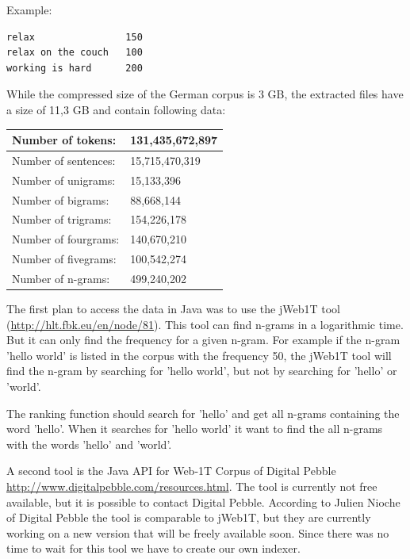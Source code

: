 \documentclass[11pt, accentcolor=tud9b, nochapname]{tudreport}
\begin{document}
Example:

\begin{lstlisting}
relax                150
relax on the couch   100
working is hard      200
\end{lstlisting}

While the compressed size of the German corpus is 3 GB, the extracted
files have a size of 11,3 GB and contain following data:

\vspace{10pt}
\begin{tabular}{| l | l |}
  \hline
  Number of tokens: & 131,435,672,897 \\ \hline
  Number of sentences: & 15,715,470,319 \\ \hline
  Number of unigrams: & 15,133,396 \\ \hline
  Number of bigrams: & 88,668,144 \\ \hline
  Number of trigrams: & 154,226,178 \\ \hline
  Number of fourgrams: & 140,670,210 \\ \hline
  Number of fivegrams: & 100,542,274 \\ \hline
  Number of n-grams: & 499,240,202 \\ \hline
\end{tabular}
\vspace{10pt}

The first plan to access the data in Java was to use the jWeb1T tool
(\url{http://hlt.fbk.eu/en/node/81}). This tool can find n-grams in a
logarithmic time. But it can only find the frequency for a given
n-gram. For example if the n-gram 'hello world' is listed in the
corpus with the frequency 50, the jWeb1T tool will find the n-gram by
searching for 'hello world', but not by searching for 'hello' or
'world'.

The ranking function should search for 'hello' and get all
n-grams containing the word 'hello'. When it searches for 'hello world' it
want to find the all n-grams with the words 'hello' and 'world'.

A second tool is the Java API for Web-1T Corpus of Digital Pebble
\url{http://www.digitalpebble.com/resources.html}. The tool is
currently not free available, but it is possible to contact Digital
Pebble. According to Julien Nioche of Digital Pebble the tool is
comparable to jWeb1T, but they are currently working on a new version
that will be freely available soon. Since there was no time to wait
for this tool we have to create our own indexer.
\end{document}
